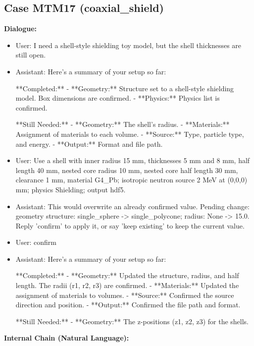 \documentclass[11pt]{ctexart}
\begin{document}
\subsection{Case MTM17 (coaxial\_shield)}
\textbf{Dialogue:}
\begin{itemize}
\item User: I need a shell-style shielding toy model, but the shell thicknesses are still open.
\item Assistant: Here's a summary of your setup so far:

**Completed:**
- **Geometry:** Structure set to a shell-style shielding model. Box dimensions are confirmed.
- **Physics:** Physics list is confirmed.

**Still Needed:**
- **Geometry:** The shell's radius.
- **Materials:** Assignment of materials to each volume.
- **Source:** Type, particle type, and energy.
- **Output:** Format and file path.
\item User: Use a shell with inner radius 15 mm, thicknesses 5 mm and 8 mm, half length 40 mm, nested core radius 10 mm, nested core half length 30 mm, clearance 1 mm, material G4\_Pb; isotropic neutron source 2 MeV at (0,0,0) mm; physics Shielding; output hdf5.
\item Assistant: This would overwrite an already confirmed value. Pending change: geometry structure: single\_sphere -> single\_polycone; radius: None -> 15.0. Reply 'confirm' to apply it, or say 'keep existing' to keep the current value.
\item User: confirm
\item Assistant: Here's a summary of your setup so far:

**Completed:**
- **Geometry:** Updated the structure, radius, and half length. The radii (r1, r2, r3) are confirmed.
- **Materials:** Updated the assignment of materials to volumes.
- **Source:** Confirmed the source direction and position.
- **Output:** Confirmed the file path and format.

**Still Needed:**
- **Geometry:** The z-positions (z1, z2, z3) for the shells.
\end{itemize}
\textbf{Internal Chain (Natural Language):}
\end{document}
